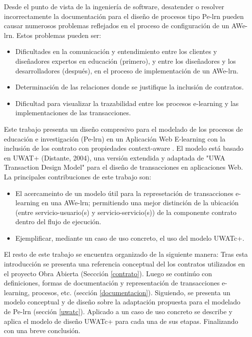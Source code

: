 \documentclass[12 pt,a4paper]{llncs}
\begin{document}
Desde el punto de vista de la ingeniería de software, desatender o resolver incorrectamente la documentación para el diseño de procesos tipo Pe-lrn pueden causar numerosos problemas reflejados en el proceso de configuración  de un AWe-lrn. Estos problemas pueden ser:


\begin{itemize}
	\item Dificultades en la comunicación y entendimiento entre los clientes y diseñadores expertos en educación (primero), y entre los diseñadores y los desarrolladores (después), en el proceso de implementación de un AWe-lrn.

	\item Determinación de las relaciones donde se justifique la inclusión de contratos.
	
	\item Dificultad para visualizar la trazabilidad entre los procesos e-learning y las implementaciones de las transacciones.

\end{itemize}

Este trabajo presenta un diseño compresivo para el modelado de los procesos de educación e investigación (Pe-lrn) en un Aplicación Web E-learning con la inclusión de los contrato con propiedades context-aware \cite{libro}. El modelo está basado en UWAT+ (Distante, 2004), una versión extendida y adaptada de "UWA Transaction Design Model" para el diseño de transacciones en aplicaciones Web. La principales contribuciones de este trabajo son:

\begin{itemize}
 \item El acercameinto de un modelo útil para la represetación de transacciones e-learning en una AWe-lrn; permitiendo una mejor distinción de la ubicación (entre servicio-usuario(s) y servicio-servicio(s)) de la componente contrato dentro del flujo de ejecución.
 \item Ejemplificar, mediante un caso de uso concreto,  el uso del modelo UWATc+.

\end{itemize}

El resto de este trabajo se encuentra organizado de la siguiente manera: Tras esta introducción se presenta una referencia conceptual del los contratos utilizados en el proyecto Obra Abierta (Seccción \ref{contrato}). Luego se continúo con definiciones, formas de documentación y representación de transacciones e-learning, procesos, etc. (sección \ref{documentacion}). Siguiendo, se presenta un modelo conceptual y de diseño sobre la adaptación propuesta para el modelado de Pe-lrn (sección \ref{uwatc}). Aplicado a un caso de uso concreto se describe y aplica el modelo de diseño UWATc+ para cada una de sus etapas. Finalizando con una breve conclusión.
\end{document}
